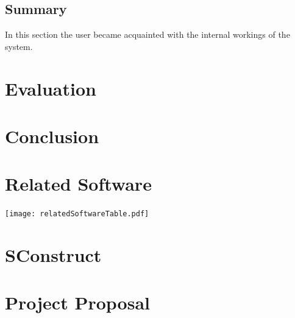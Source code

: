\documentclass[12pt,a4paper,twoside,openright]{report}
\begin{document}
\section{Summary} 
In this section the user became  acquainted with the internal workings of the system.  


\chapter{Evaluation}


\chapter{Conclusion}




\appendix
\chapter{Related Software}
\begin{center}
\texttt{[image: relatedSoftwareTable.pdf]}
\end{center}

\chapter{SConstruct}


\chapter{Project Proposal}

\end{document}
